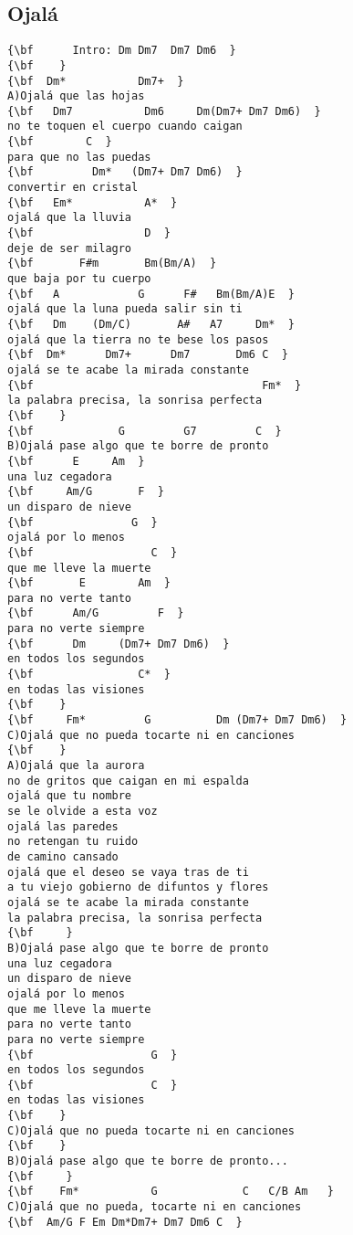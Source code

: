 \documentclass[a4paper]{article}
\begin{document}
\subsection{Ojal\'a}
\begin{Verbatim}[commandchars=\\\{\}]
{\bf  	  Intro: Dm Dm7  Dm7 Dm6  }
{\bf    }
{\bf  Dm*           Dm7+  }
A)Ojalá que las hojas  
{\bf   Dm7           Dm6     Dm(Dm7+ Dm7 Dm6)  }
no te toquen el cuerpo cuando caigan  
{\bf        C  }
para que no las puedas  
{\bf         Dm*   (Dm7+ Dm7 Dm6)  }
convertir en cristal  
{\bf   Em*           A*  }
ojalá que la lluvia  
{\bf                 D  }
deje de ser milagro   
{\bf       F#m       Bm(Bm/A)  }
que baja por tu cuerpo  
{\bf   A            G      F#   Bm(Bm/A)E  }
ojalá que la luna pueda salir sin ti  
{\bf   Dm    (Dm/C)       A#   A7     Dm*  }
ojalá que la tierra no te bese los pasos  
{\bf  Dm*      Dm7+      Dm7       Dm6 C  }
ojalá se te acabe la mirada constante  
{\bf                                   Fm*  }
la palabra precisa, la sonrisa perfecta  
{\bf    }
{\bf             G         G7         C  }
B)Ojalá pase algo que te borre de pronto  
{\bf      E     Am  }
una luz cegadora  
{\bf     Am/G       F  }
un disparo de nieve  
{\bf               G  }
ojalá por lo menos  
{\bf                  C  }
que me lleve la muerte  
{\bf       E        Am  }
para no verte tanto  
{\bf      Am/G         F  }
para no verte siempre  
{\bf      Dm     (Dm7+ Dm7 Dm6)  }
en todos los segundos  
{\bf                C*  }
en todas las visiones  
{\bf    }
{\bf     Fm*         G          Dm (Dm7+ Dm7 Dm6)  }
C)Ojalá que no pueda tocarte ni en canciones  
{\bf    }
A)Ojalá que la aurora  
no de gritos que caigan en mi espalda  
ojalá que tu nombre  
se le olvide a esta voz  
ojalá las paredes  
no retengan tu ruido  
de camino cansado  
ojalá que el deseo se vaya tras de ti  
a tu viejo gobierno de difuntos y flores  
ojalá se te acabe la mirada constante  
la palabra precisa, la sonrisa perfecta  
{\bf     }
B)Ojalá pase algo que te borre de pronto  
una luz cegadora  
un disparo de nieve  
ojalá por lo menos  
que me lleve la muerte  
para no verte tanto  
para no verte siempre  
{\bf                  G  }
en todos los segundos  
{\bf                  C  }
en todas las visiones  
{\bf    }
C)Ojalá que no pueda tocarte ni en canciones  
{\bf    }
B)Ojalá pase algo que te borre de pronto...  
{\bf     }
{\bf    Fm*           G             C   C/B Am   }
C)Ojalá que no pueda, tocarte ni en canciones  
{\bf  Am/G F Em Dm*Dm7+ Dm7 Dm6 C  }

\end{Verbatim}
\newpage
\end{document}
